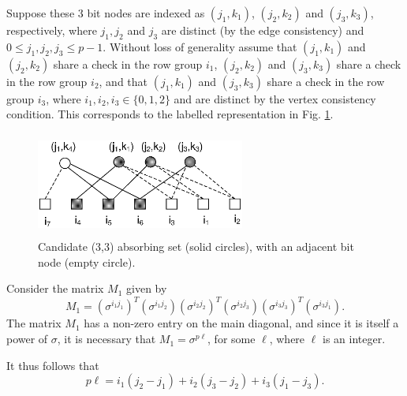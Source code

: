 Suppose these $3$ bit nodes are indexed as $(j_1,k_1)$,
$(j_2,k_2)$ and $(j_3,k_3)$, respectively, where $j_1,j_2$ and
$j_3$ are distinct (by the edge consistency) and $0 \leq j_1, j_2,
j_3 \leq p-1$. Without loss of generality assume that $(j_1,k_1)$
and $(j_2,k_2)$ share a check in the row group $i_1$, $(j_2,k_2)$
and $(j_3,k_3)$ share a check in the row group $i_2$, and that
$(j_1,k_1)$ and $(j_3,k_3)$ share a check in the row group $i_3$,
where $i_1,i_2,i_3 \in \{0,1,2\}$ and are distinct by the vertex
consistency condition. This corresponds to the labelled
representation in Fig. \ref{Fig05a}.
\begin{figure}
\center\includegraphics[width=2.7in,height=1.35in]{fig05c.eps}
\caption{Candidate (3,3) absorbing set (solid circles), with an
adjacent bit node (empty circle).}\label{Fig05a}
\end{figure}

Consider the matrix $M_1$ given by
\begin{equation}
M_1=(\sigma^{i_1j_1})^T(\sigma^{i_1j_2})(\sigma^{i_2j_2})^T(\sigma^{i_2j_3})(\sigma^{i_3j_3})^T(\sigma^{i_3j_1}).
\end{equation}
The matrix $M_1$ has a non-zero entry on the main diagonal, and
since it is itself a power of $\sigma$, it is necessary that
$M_1=\sigma^{p\ell}$, for some $\ell$, where $\ell$ is an integer.

It thus follows that\begin{equation}\label{eqpl}
p\ell=i_1(j_2-j_1)+i_2(j_3-j_2)+i_3(j_1-j_3).\end{equation}

